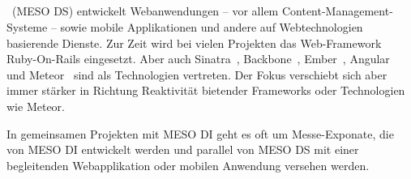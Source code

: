 \subsection{\mesods}
\label{ssec:em_meso_digital_services}

\mesods~(MESO DS) entwickelt Webanwendungen -- vor allem
Content-Management-Systeme -- sowie mobile Applikationen und andere auf
Webtechnologien basierende Dienste.  Zur Zeit wird bei vielen Projekten das
Web-Framework Ruby-On-Rails eingesetzt.  Aber auch Sinatra~\cite{sinatra},
Backbone~\cite{backbone}, Ember~\cite{ember}, Angular~\cite{angular} und
Meteor~\cite{meteor} sind als Technologien vertreten.  Der Fokus verschiebt
sich aber immer stärker in Richtung Reaktivität bietender Frameworks oder
Technologien wie Meteor.

In gemeinsamen Projekten mit MESO DI geht es oft um Messe-Exponate, die von MESO
DI entwickelt werden und parallel von MESO DS mit einer begleitenden
Webapplikation oder mobilen Anwendung versehen werden.

